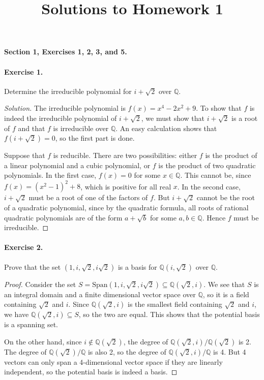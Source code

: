 \documentclass{article}
\title{Solutions to Homework 1}
\date{}
\begin{document}
\maketitle
{\noindent\bf Section 1, Exercises 1, 2, 3, and 5. }

\paragraph{Exercise 1.} Determine the irreducible polynomial for $i+\sqrt 2$ over $\mathbb Q$.
\begin{proof}[Solution]
The irreducible polynomial is $f(x)=x^4-2x^2+9$. To show that $f$ is indeed the irreducible polynomial of $i+\sqrt 2$, we must show that $i+\sqrt 2$ is a root of $f$ and that $f$ is irreducible over $\mathbb Q$. An easy calculation shows that $f(i+\sqrt 2)=0$, so the first part is done.

Suppose that $f$ is reducible. There are two possibilities: either $f$ is the product of a linear polynomial and a cubic polynomial, or $f$ is the product of two quadratic polynomials.
In the first case, $f(x)=0$ for some $x\in \mathbb Q$. This cannot be, since $f(x)=(x^2-1)^2+8$, which is positive for all real $x$. In the second case, $i+\sqrt 2$ must be a root of one of the factors of $f$. But $i+\sqrt 2$ cannot be the root of a quadratic polynomial, since by the quadratic formula, all roots of rational quadratic polynomials are of the form $a+\sqrt b$ for some $a,b\in \mathbb Q$. Hence $f$ must be irreducible.
\end{proof}

\paragraph{Exercise 2.} Prove that the set $(1,i,\sqrt 2, i\sqrt 2)$ is a basis for $\mathbb Q(i,\sqrt 2)$ over $\mathbb Q$.

\begin{proof}
Consider the set $S=\text{Span}(1,i,\sqrt 2,i\sqrt 2)\subseteq \mathbb Q(\sqrt 2,i)$. 
We see that $S$ is an integral domain and a finite dimensional vector space over $\mathbb Q$, so it is a field containing $\sqrt 2$ and $i$.  Since $\mathbb Q(\sqrt 2,i)$ is the smallest field containing $\sqrt 2$ and $i$, we have $\mathbb Q(\sqrt 2,i)\subseteq S$, so the two are equal. This shows that the potential basis is a spanning set.

On the other hand, since $i\not\in \mathbb Q(\sqrt 2)$, the degree of $\mathbb Q(\sqrt 2,i)/\mathbb Q(\sqrt 2)$ is 2. The degree of $\mathbb Q(\sqrt 2)/\mathbb Q$ is also 2, so the degree of $\mathbb Q(\sqrt 2,i)/\mathbb Q$ is 4. But 4 vectors can only span a 4-dimensional vector space if they are linearly independent, so the potential basis is indeed a basis.
\end{proof}
\end{document}
